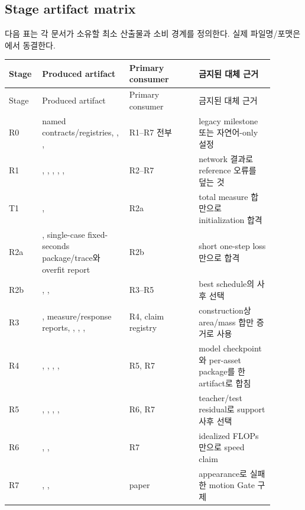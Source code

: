 \documentclass[10pt]{article}
\begin{document}
\subsection{Stage artifact matrix}

다음 표는 각 문서가 소유할 최소 산출물과 소비 경계를 정의한다. 실제 파일명/포맷은
에서 동결한다.

\begin{longtable}{L{0.09\linewidth}L{0.30\linewidth}L{0.24\linewidth}L{0.26\linewidth}}
\toprule
Stage & Produced artifact & Primary consumer & 금지된 대체 근거\\
\midrule
\endfirsthead
\toprule
Stage & Produced artifact & Primary consumer & 금지된 대체 근거\\
\midrule
\endhead
R0 & named contracts/registries, , ,  & R1--R7 전부 & legacy milestone 또는 자연어-only 설정\\
R1 & , , , , ,  & R2--R7 & network 결과로 reference 오류를 덮는 것\\
T1 & ,  & R2a & total measure 합만으로 initialization 합격\\
R2a & , single-case fixed-seconds package/trace와 overfit report & R2b & short one-step loss만으로 합격\\
R2b & , ,  & R3--R5 & best schedule의 사후 선택\\
R3 & , measure/response reports, , , ,  & R4, claim registry & construction상 area/mass 합만 증거로 사용\\
R4 & , , , ,  & R5, R7 & model checkpoint와 per-asset package를 한 artifact로 합침\\
R5 & , , , ,  & R6, R7 & teacher/test residual로 support 사후 선택\\
R6 & , ,  & R7 & idealized FLOPs만으로 speed claim\\
R7 & , ,  & paper & appearance로 실패한 motion Gate 구제\\
\bottomrule
\end{longtable}
\end{document}
